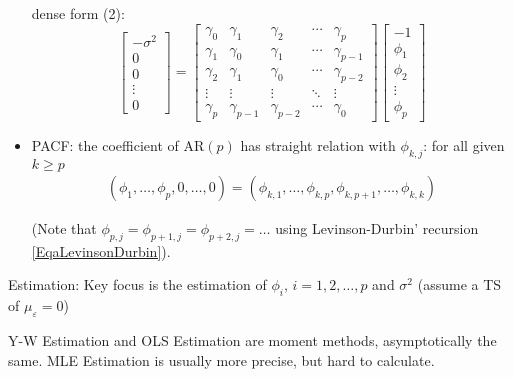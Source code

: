 \begin{itemize}[topsep=2pt,itemsep=0pt]
        dense form (2):
        \begin{equation}
            \begin{bmatrix}
                -\sigma ^2\\ 0\\ 0 \\ \vdots \\0
            \end{bmatrix} =
            \begin{bmatrix}
                \gamma _0&\gamma _1&\gamma _2&\cdots &\gamma _p\\
                \gamma _1&\gamma _0&\gamma _1&\cdots&\gamma _{p-1}\\
                \gamma _2&\gamma _1&\gamma _0&\cdots&\gamma _{p-2}\\
                \vdots&\vdots&\vdots&\ddots&\vdots\\
                \gamma _p&\gamma _{p-1}&\gamma _{p-2}&\cdots&\gamma _0
            \end{bmatrix}
            \begin{bmatrix}
                -1\\\phi _1\\\phi _2\\ \vdots \\\phi _p
            \end{bmatrix}
        \end{equation}

        \item PACF: the coefficient of AR$ (p) $ has straight relation with $ \phi _{k,j} $: for all given $ k\geq p $
        \begin{align}
            (\phi _1,\ldots,\phi _p,0,\ldots,0)=(\phi _{k,1},\ldots,\phi _{k,p},\phi _{k,p+1},\ldots,\phi _{k,k})
        \end{align}

        (Note that $ \phi _{p,j}=\phi _{p+1,j}=\phi _{p+2,j}=\ldots $ using Levinson-Durbin' recursion \autoref{EqaLevinsonDurbin}).       
        
       
    \end{itemize}
    
\begin{point}
    Estimation: Key focus is the estimation of $ \phi _i,\,i=1,2,\ldots,p $ and $ \sigma ^2 $ (assume a TS of $ \mu _\varepsilon =0 $)
\end{point}

    Y-W Estimation and OLS Estimation are moment methods, asymptotically the same. MLE Estimation is usually more precise, but hard to calculate.

